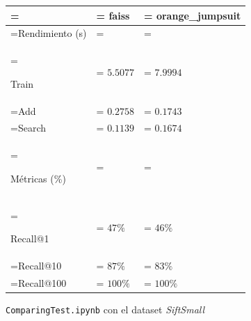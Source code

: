 \begin{figure}[ht]
\begin{center}
\renewcommand{\arraystretch}{1.5}
{
    \begin{tabularx}{0.8\textwidth} {
       >{\hsize=1\hsize\linewidth=\hsize}X 
       >{\hsize=1\hsize\linewidth=\hsize\centering\arraybackslash}X 
       >{\hsize=1\hsize\linewidth=\hsize\centering\arraybackslash}X }
    \hline 

    \rowcolor{white}
     & \textbf{faiss} & \textbf{orange\_jumpsuit} \\

    \hline

    Rendimiento (s) & & \\

    \hline 

    Train   & $5.5077$ & $7.9994$ \\
    Add     & $0.2758$ & $0.1743$ \\
    Search  & $0.1139$ & $0.1674$ \\

    \hline 

    M\'etricas (\%) & & \\

    \hline 

    Recall@1    & $47\%$ & $46\%$ \\
    Recall@10   & $87\%$ & $83\%$ \\
    Recall@100  & $100\%$ & $100\%$ \\

    \hline 
    \end{tabularx}
}
\end{center}

\caption{\texttt{ComparingTest.ipynb} con el dataset \textit{SiftSmall}}
\label{fig:comparingtest_siftsmall}

\end{figure}
